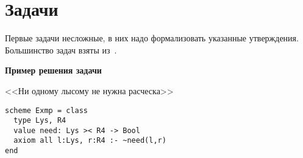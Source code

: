 \documentclass[14pt]{extreport}
\newcounter{problem_type}[chapter]
\begin{document}
\section*{Задачи}

Первые задачи несложные, в них надо формализовать указанные утверждения. Большинство задач взяты из~\cite{nepeivoda}.

\textbf{Пример решения задачи}

<<Ни одному лысому не нужна расческа>>

\begin{lstlisting}
scheme Exmp = class
  type Lys, R4
  value need: Lys >< R4 -> Bool
  axiom all l:Lys, r:R4 :- ~need(l,r)
end
\end{lstlisting}

\addtocounter{problem_type}{1}
\end{document}
